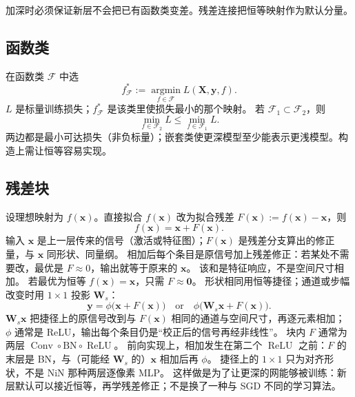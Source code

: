 



加深时必须保证新层不会把已有函数类变差。残差连接把恒等映射作为默认分量。

\subsection{函数类}

在函数类 $\mathcal{F}$ 中选
\[
f^{\ast}_{\mathcal{F}}
:=
\operatorname*{argmin}_{f\in\mathcal{F}}
L(\bm{X},\bm{y},f).
\]
$L$ 是标量训练损失；$f^{\ast}_{\mathcal{F}}$ 是该类里使损失最小的那个映射。
若 $\mathcal{F}_1\subset\mathcal{F}_2$，则
\[
\min_{f\in\mathcal{F}_2}L
\le
\min_{f\in\mathcal{F}_1}L.
\]
两边都是最小可达损失（非负标量）；嵌套类使更深模型至少能表示更浅模型。构造上需让恒等容易实现。

\subsection{残差块}

设理想映射为 $f(\bm{x})$。直接拟合 $f(\bm{x})$ 改为拟合残差 $F(\bm{x}):=f(\bm{x})-\bm{x}$，则
\[
f(\bm{x})=\bm{x}+F(\bm{x}).
\]
输入 $\bm{x}$ 是上一层传来的信号（激活或特征图）；$F(\bm{x})$ 是残差分支算出的修正量，与 $\bm{x}$ 同形状、同量纲。
相加后每个条目是原信号加上残差修正：若某处不需要改，最优是 $F\approx 0$，输出就等于原来的 $\bm{x}$。
该和是特征响应，不是空间尺寸相加。
若最优为恒等 $f(\bm{x})=\bm{x}$，只需 $F\approx\bm{0}$。
形状相同用恒等捷径；通道或步幅改变时用 $1\times 1$ 投影 $\bm{W}_s$：
\[
\bm{y}
=
\phi\bigl(\bm{x}+F(\bm{x})\bigr)
\quad\text{or}\quad
\phi\bigl(\bm{W}_s\bm{x}+F(\bm{x})\bigr).
\]
$\bm{W}_s\bm{x}$ 把捷径上的原信号改到与 $F(\bm{x})$ 相同的通道与空间尺寸，再逐元素相加；
$\phi$ 通常是 ReLU，输出每个条目仍是“校正后的信号再经非线性”。
块内 $F$ 通常为两层 $\operatorname{Conv}\circ\mathrm{BN}\circ\operatorname{ReLU}$。
前向实现上，相加发生在第二个 $\operatorname{ReLU}$ 之前：$F$ 的末层是 BN，与（可能经 $\bm{W}_s$ 的）$\bm{x}$ 相加后再 $\phi$。
捷径上的 $1\times 1$ 只为对齐形状，不是 NiN 那种两层逐像素 MLP。
这样做是为了让更深的网能够被训练：新层默认可以接近恒等，再学残差修正；不是换了一种与 SGD 不同的学习算法。

